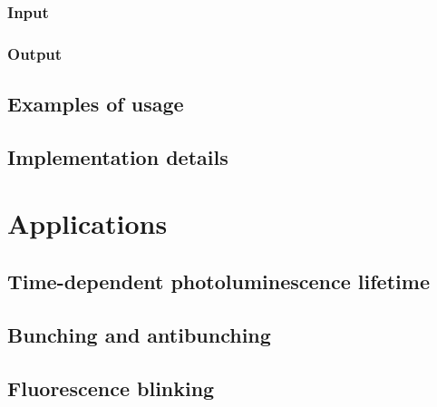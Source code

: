 \documentclass{article}
\begin{document}
\subsubsection{Input}
\subsubsection{Output}

\subsection{Examples of usage}
\subsection{Implementation details}


\section{Applications}
\subsection{Time-dependent photoluminescence lifetime}
\subsection{Bunching and antibunching}
\subsection{Fluorescence blinking}
\end{document}
